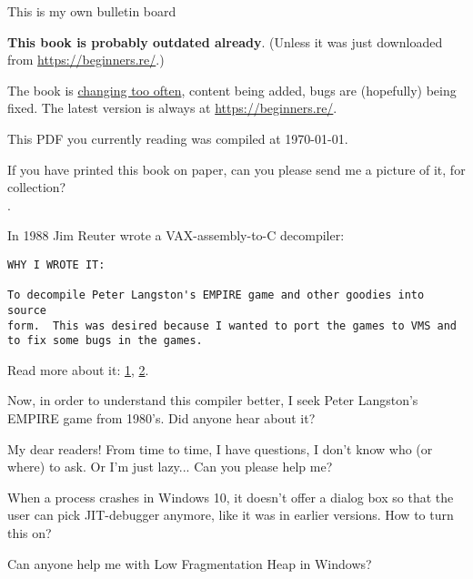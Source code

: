 
\begin{center}
\LARGE{} This is my own bulletin board \normalsize{}
\end{center}

\textbf{This book is probably outdated already}.
(Unless it was just downloaded from \url{https://beginners.re/}.)

The book is \href{\RepoURL/ChangeLog}{changing too often},
content being added, bugs are (hopefully) being fixed.
The latest version is always at \url{https://beginners.re/}.

This PDF you currently reading was compiled at \today{}.

\myhrule{}

If you have printed this book on paper, can you please send me a picture of it, for collection?\\
\EMAILS{}.

\myhrule{}

In 1988 Jim Reuter wrote a VAX-assembly-to-C decompiler:

\begin{lstlisting}
WHY I WROTE IT:

To decompile Peter Langston's EMPIRE game and other goodies into source
form.  This was desired because I wanted to port the games to VMS and
to fix some bugs in the games.
\end{lstlisting}

Read more about it:
\href{http://www.program-transformation.org/Transform/DecompReadMe}{1},
\href{http://www.program-transformation.org/Transform/DecompDecompiler}{2}.

Now, in order to understand this compiler better, I seek Peter Langston's EMPIRE game from 1980's.
Did anyone hear about it?

\myhrule{}

My dear readers! From time to time, I have questions, I don't know who (or where) to ask.
Or I'm just lazy...
Can you please help me?

\myhrule{}

When a process crashes in Windows 10, it doesn't offer a dialog box so that the user can pick JIT-debugger anymore,
like it was in earlier versions.
How to turn this on?

\myhrule{}

Can anyone help me with Low Fragmentation Heap in Windows?

\myhrule{}

